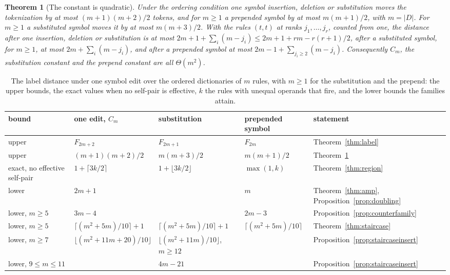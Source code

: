\documentclass[11pt,a4paper]{article}
\theoremstyle{definition}
\theoremstyle{plain}
\newtheorem{theorem}{Theorem}
\begin{document}
\begin{theorem}[The constant is quadratic]\label{thm:quadratic}
Under the ordering condition one symbol insertion, deletion or substitution moves the tokenization by at most
\((m + 1)(m + 2)/2\) tokens, and for \(m \ge 1\) a prepended symbol by at most \(m(m + 1)/2\), with \(m = |D|\). For
\(m \ge 1\) a substituted symbol moves it by at most \(m(m + 3)/2\). With the rules \((t, t)\) at ranks
\(j_1, \dots, j_r\), counted from one, the distance after one insertion, deletion or substitution is at most
\(2m + 1 + \sum_i (m - j_i) \le 2m + 1 + rm - r(r + 1)/2\), after a substituted symbol, for \(m \ge 1\), at most
\(2m + \sum_i (m - j_i)\), and after a prepended symbol at most \(2m - 1 + \sum_{j_i \ge 2} (m - j_i)\). Consequently
\(C_m\), the substitution constant and the prepend constant are all \(\Theta(m^2)\).
\end{theorem}

\begin{table}[t]
\centering
\small
\setlength{\tabcolsep}{4pt}
\begin{tabular}{@{}>{\raggedright\arraybackslash}p{}lll>{\raggedright\arraybackslash}p{}@{}}
\toprule
bound & one edit, \(C_m\) & substitution & prepended symbol & statement \\
\midrule
upper & \(F_{2m+2}\) & \(F_{2m+1}\) & \(F_{2m}\) & Theorem~\ref{thm:label} \\
\addlinespace
upper & \((m + 1)(m + 2)/2\) & \(m(m + 3)/2\) & \(m(m + 1)/2\) & Theorem~\ref{thm:quadratic} \\
\addlinespace
exact, no effective self-pair & \(1 + \lceil 3k/2 \rceil\) & \(1 + \lfloor 3k/2 \rfloor\) & \(\max(1, k)\)
  & Theorem~\ref{thm:region} \\
\addlinespace
lower & \(2m + 1\) & & \(m\) & Theorem~\ref{thm:amp}, Proposition~\ref{prop:doubling} \\
\addlinespace
lower, \(m \ge 5\) & \(3m - 4\) & & \(2m - 3\) & Proposition~\ref{prop:counterfamily} \\
\addlinespace
lower, \(m \ge 5\) & \(\lceil (m^2 + 5m)/10 \rceil + 1\) & \(\lceil (m^2 + 5m)/10 \rceil + 1\)
  & \(\lceil (m^2 + 5m)/10 \rceil\) & Theorem~\ref{thm:staircase} \\
\addlinespace
lower, \(m \ge 7\) & \(\lfloor (m^2 + 11m + 20)/10 \rfloor\) & \(\lfloor (m^2 + 11m)/10 \rfloor\), \(m \ge 12\)
  & & Proposition~\ref{prop:staircaseinsert} \\
\addlinespace
lower, \(9 \le m \le 11\) & & \(4m - 21\) & & Proposition~\ref{prop:staircaseinsert} \\
\bottomrule
\end{tabular}
\caption{The label distance under one symbol edit over the ordered dictionaries of \(m\) rules, with \(m \ge 1\) for
the substitution and the prepend: the upper bounds, the exact values when no self-pair is effective, \(k\) the rules
with unequal operands that fire, and the lower bounds the families attain.}
\label{tab:amp}
\end{table}
\end{document}
